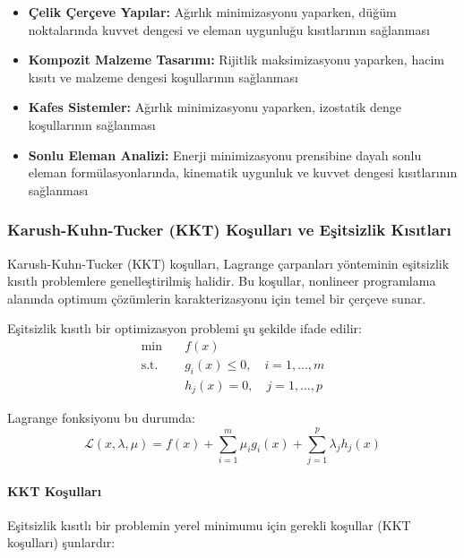 \begin{tcolorbox}[title=Lagrange Yönteminin Yapısal Optimizasyondaki Uygulamaları]
\begin{itemize}
    \item \textbf{Çelik Çerçeve Yapılar:} Ağırlık minimizasyonu yaparken, düğüm noktalarında kuvvet dengesi ve eleman uygunluğu kısıtlarının sağlanması
    
    \item \textbf{Kompozit Malzeme Tasarımı:} Rijitlik maksimizasyonu yaparken, hacim kısıtı ve malzeme dengesi koşullarının sağlanması
    
    \item \textbf{Kafes Sistemler:} Ağırlık minimizasyonu yaparken, izostatik denge koşullarının sağlanması
    
    \item \textbf{Sonlu Eleman Analizi:} Enerji minimizasyonu prensibine dayalı sonlu eleman formülasyonlarında, kinematik uygunluk ve kuvvet dengesi kısıtlarının sağlanması
\end{itemize}
\end{tcolorbox}

\subsubsection{Karush-Kuhn-Tucker (KKT) Koşulları ve Eşitsizlik Kısıtları}

Karush-Kuhn-Tucker (KKT) koşulları, Lagrange çarpanları yönteminin eşitsizlik kısıtlı problemlere genelleştirilmiş halidir. Bu koşullar, nonlineer programlama alanında optimum çözümlerin karakterizasyonu için temel bir çerçeve sunar.

Eşitsizlik kısıtlı bir optimizasyon problemi şu şekilde ifade edilir:
\begin{equation}
\begin{aligned}
\min & \quad f(x) \\
\text{s.t.} & \quad g_i(x) \leq 0, \quad i = 1, \ldots, m \\
& \quad h_j(x) = 0, \quad j = 1, \ldots, p
\end{aligned}
\end{equation}

Lagrange fonksiyonu bu durumda:
\begin{equation}
\mathcal{L}(x,\lambda,\mu) = f(x) + \sum_{i=1}^m \mu_i g_i(x) + \sum_{j=1}^p \lambda_j h_j(x)
\end{equation}

\paragraph{KKT Koşulları}
Eşitsizlik kısıtlı bir problemin yerel minimumu için gerekli koşullar (KKT koşulları) şunlardır:

